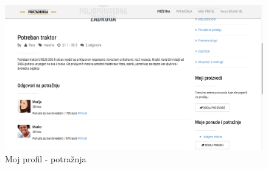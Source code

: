 \documentclass[a4paper]{article}
\begin{document}
\begin{figure}[h!]
    \centering
    \includegraphics[scale=0.3]{images/profile3.png}
    \caption{Moj profil - potražnja}
    \label{profile3}
\end{figure}
    
\end{document}
